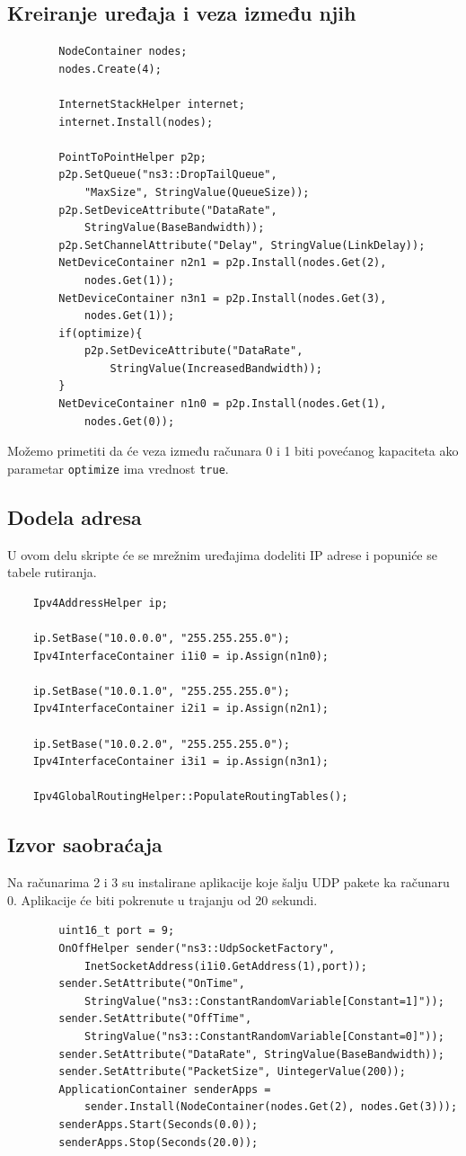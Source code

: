 \documentclass[a4paper, 12pt, projekat]{etf}
\begin{document}
	\subsection{Kreiranje uređaja i veza između njih}
	\begin{verbatim}
		NodeContainer nodes;
		nodes.Create(4);
		
		InternetStackHelper internet;
		internet.Install(nodes);
		
		PointToPointHelper p2p;
		p2p.SetQueue("ns3::DropTailQueue",
		    "MaxSize", StringValue(QueueSize));
		p2p.SetDeviceAttribute("DataRate", 
		    StringValue(BaseBandwidth));
		p2p.SetChannelAttribute("Delay", StringValue(LinkDelay));
		NetDeviceContainer n2n1 = p2p.Install(nodes.Get(2), 
		    nodes.Get(1));
		NetDeviceContainer n3n1 = p2p.Install(nodes.Get(3), 
		    nodes.Get(1));
		if(optimize){
			p2p.SetDeviceAttribute("DataRate", 
			    StringValue(IncreasedBandwidth));
		}
		NetDeviceContainer n1n0 = p2p.Install(nodes.Get(1),
		    nodes.Get(0));
	\end{verbatim}
	
	Možemo primetiti da će veza između računara 0 i 1 biti povećanog ka\-pa\-citeta ako parametar \verb|optimize| ima vrednost \verb|true|.
	\subsection{Dodela adresa}
	U ovom delu skripte će se mrežnim uređajima dodeliti IP adrese i po\-puniće se tabele rutiranja.
	\begin{verbatim}
	Ipv4AddressHelper ip;
	
	ip.SetBase("10.0.0.0", "255.255.255.0");
	Ipv4InterfaceContainer i1i0 = ip.Assign(n1n0);
	
	ip.SetBase("10.0.1.0", "255.255.255.0");
	Ipv4InterfaceContainer i2i1 = ip.Assign(n2n1);
	
	ip.SetBase("10.0.2.0", "255.255.255.0");
	Ipv4InterfaceContainer i3i1 = ip.Assign(n3n1);
	
	Ipv4GlobalRoutingHelper::PopulateRoutingTables();
	\end{verbatim}
	\subsection{Izvor saobraćaja}
	Na računarima 2 i 3 su instalirane aplikacije koje šalju UDP pakete ka računaru 0. Aplikacije će biti pokrenute u trajanju od 20 sekundi.
	\begin{verbatim}
		uint16_t port = 9;
		OnOffHelper sender("ns3::UdpSocketFactory",
		    InetSocketAddress(i1i0.GetAddress(1),port));
		sender.SetAttribute("OnTime", 
		    StringValue("ns3::ConstantRandomVariable[Constant=1]"));
		sender.SetAttribute("OffTime", 
		    StringValue("ns3::ConstantRandomVariable[Constant=0]"));
		sender.SetAttribute("DataRate", StringValue(BaseBandwidth));
		sender.SetAttribute("PacketSize", UintegerValue(200));
		ApplicationContainer senderApps = 
		    sender.Install(NodeContainer(nodes.Get(2), nodes.Get(3)));
		senderApps.Start(Seconds(0.0));
		senderApps.Stop(Seconds(20.0));
	\end{verbatim}
\end{document}
